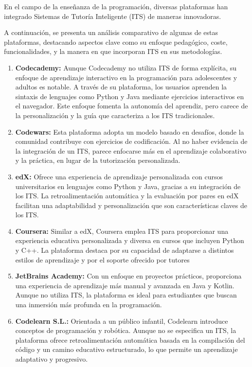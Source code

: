 En el campo de la enseñanza de la programación, diversas plataformas han integrado Sistemas de Tutoría Inteligente (ITS) de maneras innovadoras. 

A continuación, se presenta un análisis comparativo de algunas de estas plataformas, destacando aspectos clave como su enfoque pedagógico, coste, funcionalidades, y la manera en que incorporan ITS en sus metodologías.

\begin{enumerate}
    \item \textbf{Codecademy:} Aunque Codecademy no utiliza ITS de forma explícita, su enfoque de aprendizaje interactivo en la programación para adolescentes y adultos es notable. A través de su plataforma, los usuarios aprenden la sintaxis de lenguajes como Python y Java mediante ejercicios interactivos en el navegador. Este enfoque fomenta la autonomía del aprendiz, pero carece de la personalización y la guía que caracteriza a los ITS tradicionales.
    
    \item \textbf{Codewars:} Esta plataforma adopta un modelo basado en desafíos, donde la comunidad contribuye con ejercicios de codificación. Al no haber evidencia de la integración de un ITS, parece enfocarse más en el aprendizaje colaborativo y la práctica, en lugar de la tutorización personalizada.

    \item \textbf{edX:} Ofrece una experiencia de aprendizaje personalizada con cursos universitarios en lenguajes como Python y Java, gracias a su integración de los ITS. La retroalimentación automática y la evaluación por pares en edX facilitan una adaptabilidad y personalización que son características claves de los ITS.
    
    \item \textbf{Coursera:} Similar a edX, Coursera emplea ITS para proporcionar una experiencia educativa personalizada y diversa en cursos que incluyen Python y C++. La plataforma destaca por su capacidad de adaptarse a distintos estilos de aprendizaje y por el soporte ofrecido por tutores
    
    \item \textbf{JetBrains Academy:}  Con un enfoque en proyectos prácticos, proporciona una experiencia de aprendizaje más manual y avanzada en Java y Kotlin. Aunque no utiliza ITS, la plataforma es ideal para estudiantes que buscan una inmersión más profunda en la programación.
    
    \item \textbf{Codelearn S.L.:} Orientada a un público infantil, Codelearn introduce conceptos de programación y robótica. Aunque no se especifica un ITS, la plataforma ofrece retroalimentación automática basada en la compilación del código y un camino educativo estructurado, lo que permite un aprendizaje adaptativo y progresivo.
    

\end{enumerate}
